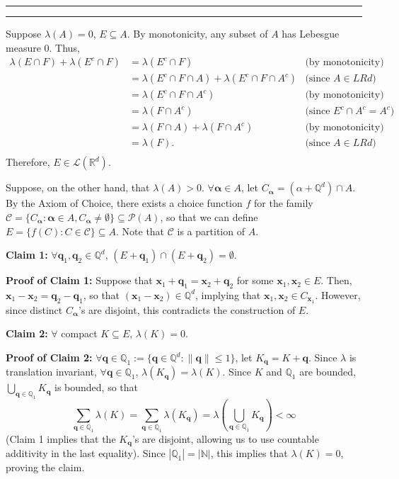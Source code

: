 \documentclass[11pt]{article}
\newcounter{questionCounter}
\newcounter{partCounter}[questionCounter]
\newenvironment{question}[2][\arabic{questionCounter}]{%
    \setcounter{partCounter}{0}%
    \vspace{.25in} \hrule \vspace{0.5em}%
        \noindent{\bf #2}%
    \vspace{0.8em} \hrule \vspace{.10in}%
    \addtocounter{questionCounter}{1}%
}{}
\newcommand{\bx}{\mathbf{x}}
\newcommand{\bq}{\mathbf{q}}
\newcommand{\balpha}{\boldsymbol{\alpha}}
\newcommand{\N}{\mathbb{N}} %
\newcommand{\Q}{\mathbb{Q}} %
\newcommand{\R}{\mathbb{R}} %
\newcommand{\pow}[1]{\mathcal{P}\left(#1\right)} %
\newcommand{\LRd}{\mathcal{L}\left(\R^d\right)} %
\begin{document}
\begin{question}{Problem 3}
Suppose $\lambda(A) = 0$, $E \subseteq A$. By monotonicity, any subset
of $A$ has Lebesgue measure $0$. Thus,
\begin{align*}
\lambda(E \cap F) + \lambda (E^c \cap F)
 & = \lambda(E^c \cap F)                        & \mbox{(by monotonicity)}              \\
 & = \lambda\left( E^c \cap F \cap A \right)
   + \lambda\left( E^c \cap F \cap A^c\right)   & \mbox{(since $A \in LRd$)}            \\
 & = \lambda\left( E^c \cap F \cap A^c\right)   & \mbox{(by monotonicity)}              \\
 & = \lambda\left( F \cap A^c \right)           & \mbox{(since $E^c \cap A^c = A^c$)}   \\
 & = \lambda\left( F \cap A \right)
   + \lambda\left( F \cap A^c \right)           & \mbox{(by monotonicity)}              \\
 & = \lambda\left( F \right).                   & \mbox{(since $A \in LRd$)}            \\
\end{align*}
Therefore, $E \in \LRd$.

Suppose, on the other hand, that $\lambda(A) > 0$. $\forall \balpha \in A$,
let $C_{\balpha} = \left( \alpha + \Q^d \right) \cap A$. By the Axiom of Choice, there
exists a choice function $f$ for the family
$\mathcal{C} = \{C_{\balpha} : \balpha \in A, C_{\balpha} \neq \emptyset\}
\subseteq \pow{A}$, so that we
can define $E = \{f(C) : C \in \mathcal{C}\} \subseteq A$. Note that
$\mathcal{C}$ is a partition of $A$.

{\bf Claim 1:} $\forall \bq_1,\bq_2 \in \Q^d$,
$(E + \bq_1) \cap (E + \bq_2) = \emptyset$.

{\bf Proof of Claim 1:} Suppose that $\bx_1 + \bq_1 = \bx_2 + \bq_2$ for some
$\bx_1,\bx_2 \in E$. Then, $\bx_1 - \bx_2 = \bq_2 - \bq_1$, so that
$(\bx_1 - \bx_2) \in \Q^d$, implying that $\bx_1,\bx_2 \in C_{\bx_1}$.
However, since distinct $C_{\balpha}$'s are disjoint, this contradicts the
construction of $E$.

{\bf Claim 2:} $\forall$ compact $K \subseteq E$, $\lambda(K) = 0$.

{\bf Proof of Claim 2:}
$\forall \bq \in \Q_1 := \{\bq \in \Q^d : \|\bq\| \leq 1\}$, let
$K_{\bq} =  K + \bq$. Since $\lambda$ is translation invariant,
$\forall \bq \in \Q_1$, $\lambda(K_{\bq}) = \lambda(K)$. Since $K$ and $\Q_1$
are bounded,  $\bigcup_{\bq \in \Q_1} K_{\bq}$ is bounded, so that
\[\sum_{\bq \in \Q_1} \lambda(K)
 = \sum_{\bq \in \Q_1} \lambda(K_{\bq})
 = \lambda\left( \bigcup_{\bq \in \Q_1} K_{\bq} \right)
 < \infty\]
(Claim 1 implies that the $K_{\bq}$'s are disjoint, allowing us to use
countable additivity in the last equality). Since $|\Q_1| = |\N|$, this
implies that $\lambda(K) = 0$, proving the claim.


\end{question}
\end{document}
